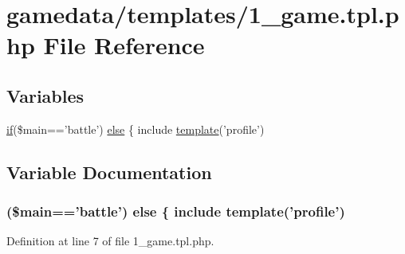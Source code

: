 \hypertarget{1__game_8tpl_8php}{\section{gamedata/templates/1\+\_\+game.tpl.\+php File Reference}
\label{1__game_8tpl_8php}
}
\subsection*{Variables}
\begin{DoxyCompactItemize}
\item 
\hyperlink{login__old_8php_a4ac1118c2e44c513a674bc1793ba6c90}{if}(\$main=='battle') \hyperlink{1__game_8tpl_8php_a361dfe2f4459557232fd19b5532cd211}{else} \{ include \hyperlink{global_8func_8php_a771b4d6b781f2a19234e18314036fe79}{template}('profile')
\end{DoxyCompactItemize}


\subsection{Variable Documentation}
\hypertarget{1__game_8tpl_8php_a361dfe2f4459557232fd19b5532cd211}{
\subsubsection[{else}]{ (\$main=='battle') else \{ include {\bf template}('profile')}}\label{1__game_8tpl_8php_a361dfe2f4459557232fd19b5532cd211}


Definition at line 7 of file 1\+\_\+game.\+tpl.\+php.

